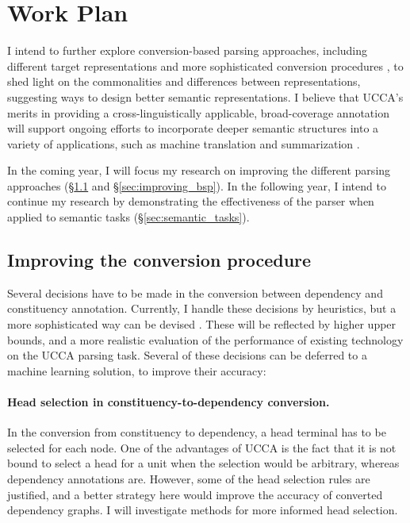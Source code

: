 \documentclass[12pt]{article}
\begin{document}
\section{Work Plan}\label{sec:plan}

I intend to further explore conversion-based parsing approaches,
including different target representations and more sophisticated conversion
procedures \cite{kong-15},
to shed light on the commonalities and differences between representations,
suggesting ways to design better semantic representations.
I believe that UCCA's merits in providing a cross-linguistically applicable,
broad-coverage annotation will support ongoing efforts to incorporate deeper
semantic structures into a variety of applications, such as machine translation
\cite{jones2012semantics} and summarization \cite{liu2015toward}.

In the coming year, I will focus my research on improving the different parsing approaches
(\S\ref{sec:improving_conversions} and \S\ref{sec:improving_bsp}).
In the following year, I intend to continue my research by demonstrating the effectiveness
of the parser when applied to semantic tasks (\S\ref{sec:semantic_tasks}).


\subsection{Improving the conversion procedure}\label{sec:improving_conversions}
Several decisions have to be made in the conversion between dependency and
constituency annotation.
Currently, I handle these decisions by heuristics, but a more
sophisticated way can be devised \cite{fernandez2015parsing}.
These will be reflected by higher upper bounds, and a more realistic evaluation
of the performance of existing technology on the UCCA parsing task.
Several of these decisions can be deferred to a machine learning solution,
to improve their accuracy:

\paragraph{Head selection in constituency-to-dependency conversion.}
In the conversion from constituency to dependency, a head terminal has to be
selected for each node. One of the advantages of UCCA is the fact that it is not bound
to select a head for a unit when the selection would be arbitrary, whereas dependency
annotations are. However, some of the head selection rules are justified, and a
better strategy here would improve the accuracy of converted dependency graphs.
I will investigate methods for more informed head selection.
\end{document}
